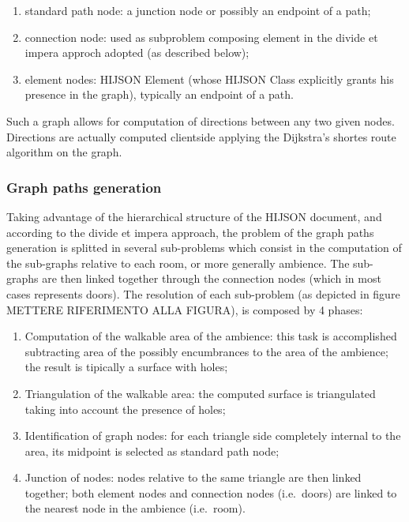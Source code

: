 \documentclass{sig-alternate}
\begin{document}
\begin{enumerate}
\def\labelenumi{\alph{enumi}.}
\item
  standard path node: a junction node or possibly an endpoint of a path;
\item
  connection node: used as subproblem composing element in the divide et impera approch adopted (as described below);
\item
  element nodes: HIJSON Element (whose HIJSON Class explicitly grants his presence in the graph), typically an endpoint of a path.
\end{enumerate}

Such a graph allows for computation of directions between any two given nodes. Directions are actually computed clientside applying the Dijkstra's shortes route algorithm on the graph.

\subsubsection{Graph paths generation}\label{graph-paths-generation}

Taking advantage of the hierarchical structure of the HIJSON document, and according to the divide et impera approach, the problem of the graph paths generation is splitted in several sub-problems which consist in the computation of the sub-graphs relative to each room, or more generally ambience. The sub-graphs are then linked together through the connection nodes (which in most cases represents doors). The resolution of each sub-problem (as depicted in figure METTERE RIFERIMENTO ALLA
FIGURA), is composed by 4 phases: 

\begin{enumerate}
\item 
  Computation of the walkable area of the ambience: this task is accomplished subtracting area of the possibly encumbrances to the area of the ambience; the result is tipically a surface with holes; 
\item 
  Triangulation of the walkable area: the computed surface is triangulated taking into account the presence of holes; 
\item 
  Identification of graph nodes: for each triangle side completely internal to the area, its midpoint is selected as standard path node; 
\item 
  Junction of nodes: nodes relative to the same triangle are then linked together; both element nodes and connection nodes (i.e.~doors) are linked to the nearest node in the ambience (i.e.~room).
\end{enumerate}
\end{document}

